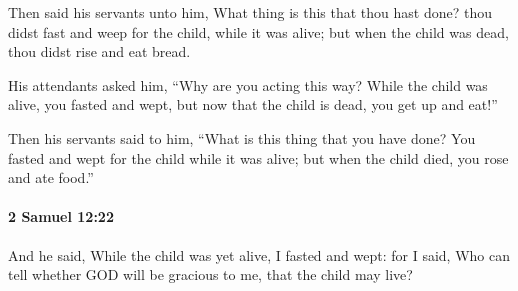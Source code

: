 			\begin{versebox}
					\item[BHS] 
					\item[ASV] Then said his servants unto him, What thing is this that thou hast done? thou didst fast and weep for the child, while it was alive; but when the child was dead, thou didst rise and eat bread.
					\item[NIV] His attendants asked him, “Why are you acting this way? While the child was alive, you fasted and wept, but now that the child is dead, you get up and eat!”
					\item[NRSV] Then his servants said to him, “What is this thing that you have done? You fasted and wept for the child while it was alive; but when the child died, you rose and ate food.”
			\end{versebox}

		\paragraph{2 Samuel 12:22} %
			\label{2SAMUEL-12-22}

			And he said, While the child was yet alive, I fasted and wept: for I said, Who can tell whether GOD will be gracious to me, that the child may live?

